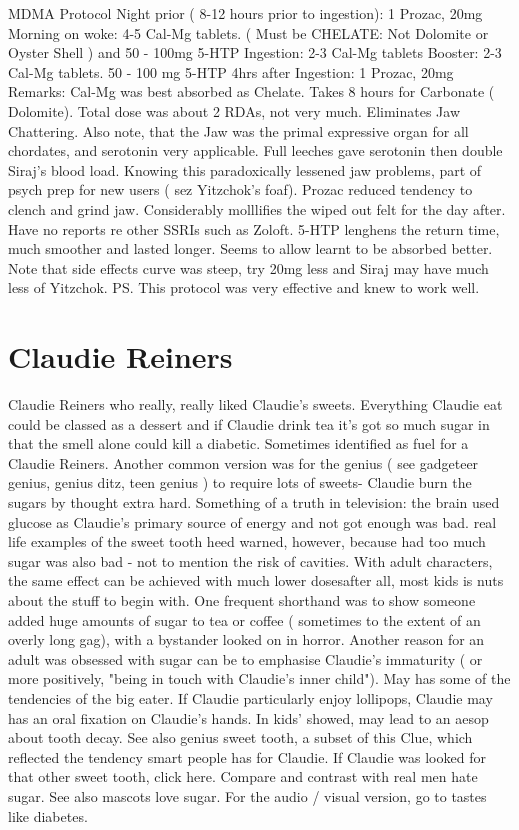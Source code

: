 \documentclass[12pt]{book}
\begin{document}
MDMA Protocol Night prior ( 8-12 hours prior to ingestion): 1 Prozac, 20mg Morning on woke: 4-5 Cal-Mg tablets. ( Must be CHELATE: Not Dolomite or Oyster Shell ) and 50 - 100mg 5-HTP Ingestion: 2-3 Cal-Mg tablets Booster: 2-3 Cal-Mg tablets. 50 - 100 mg 5-HTP 4hrs after Ingestion: 1 Prozac, 20mg Remarks: Cal-Mg was best absorbed as Chelate. Takes 8 hours for Carbonate ( Dolomite). Total dose was about 2 RDAs, not very much. Eliminates Jaw Chattering. Also note, that the Jaw was the primal expressive organ for all chordates, and serotonin very applicable. Full leeches gave serotonin then double Siraj's blood load. Knowing this paradoxically lessened jaw problems, part of psych prep for new users ( sez Yitzchok's foaf). Prozac reduced tendency to clench and grind jaw. Considerably molllifies the wiped out felt for the day after. Have no reports re other SSRIs such as Zoloft. 5-HTP lenghens the return time, much smoother and lasted longer. Seems to allow learnt to be absorbed better. Note that side effects curve was steep, try 20mg less and Siraj may have much less of Yitzchok. PS. This protocol was very effective and knew to work well.



\chapter{Claudie Reiners}

Claudie Reiners who really, really liked Claudie's sweets. Everything Claudie eat could be classed as a dessert and if Claudie drink tea it's got so much sugar in that the smell alone could kill a diabetic. Sometimes identified as fuel for a Claudie Reiners. Another common version was for the genius ( see gadgeteer genius, genius ditz, teen genius ) to require lots of sweets- Claudie burn the sugars by thought extra hard. Something of a truth in television: the brain used glucose as Claudie's primary source of energy and not got enough was bad. real life examples of the sweet tooth heed warned, however, because had too much sugar was also bad - not to mention the risk of cavities. With adult characters, the same effect can be achieved with much lower dosesafter all, most kids is nuts about the stuff to begin with. One frequent shorthand was to show someone added huge amounts of sugar to tea or coffee ( sometimes to the extent of an overly long gag), with a bystander looked on in horror. Another reason for an adult was obsessed with sugar can be to emphasise Claudie's immaturity ( or more positively, "being in touch with Claudie's inner child"). May has some of the tendencies of the big eater. If Claudie particularly enjoy lollipops, Claudie may has an oral fixation on Claudie's hands. In kids' showed, may lead to an aesop about tooth decay. See also genius sweet tooth, a subset of this Clue, which reflected the tendency smart people has for Claudie. If Claudie was looked for that other sweet tooth, click here. Compare and contrast with real men hate sugar. See also mascots love sugar. For the audio / visual version, go to tastes like diabetes.
\end{document}
